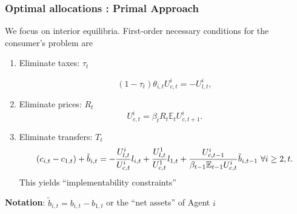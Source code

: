 \documentclass{beamer}
\begin{document}
\begin{frame}
 \frametitle{Optimal allocations : Primal Approach}
We focus on  interior equilibria. First-order necessary conditions for the  consumer's problem
 are%
 
 \begin{enumerate}
  \item Eliminate taxes: $\tau_t$
  
\begin{equation*}
\left( 1-\tau _{t}\right) \theta _{i,t}U_{c,t}^{i}=-U_{l,t}^{i},
\end{equation*}%
\item Eliminate prices: $R_t$
\begin{equation*}
U_{c,t}^{i}=\beta_tR_{t}\mathbb{E}_{t}U_{c,t+1}^{i}.  \label{FOC Euler}
\end{equation*}%
\item Eliminate transfers: $T_t$
\begin{equation*}
\left( c_{i,t}-c_{1,t}\right) +\tilde{b}_{i,t} =-\frac{U_{l,t}^{i}}{U_{c,t}^{i}}l_{i,t}+\frac{U^1_{l,t}}{U^1_{c,t}}l_{1,t} +\frac{U_{c,t-1}^{i}}{\beta_{t-1} \mathbb{E}%
_{t-1}U_{c,t}^{i}}\tilde{b}_{i,t-1}\ \forall i\geq2,t.  \notag 
\end{equation*}
This yields ``implementability constraints''%
 \end{enumerate}
\textbf{Notation}: $\tilde{b}_{i,t}=b_{i,t}-b_{1,t}$ or the ``net assets'' of Agent $i$
\end{frame}
\end{document}
